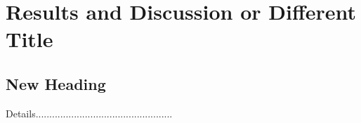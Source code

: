 \chapter{Results and Discussion or Different Title}




\section{New Heading}
\begin{justify}
    Details..................................................
\end{justify}


